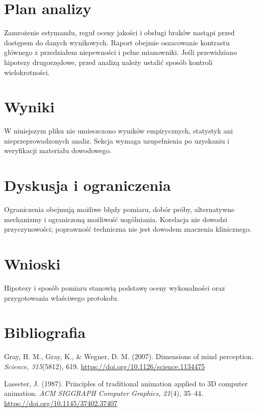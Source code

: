 \documentclass[11pt,a4paper]{article}
\begin{document}
\section{Plan analizy}

Zamrożenie estymandu, reguł oceny jakości i obsługi braków nastąpi przed dostępem do danych wynikowych. Raport obejmie oszacowanie kontrastu głównego z przedziałem niepewności i pełne mianowniki. Jeśli przewidziano hipotezy drugorzędowe, przed analizą należy ustalić sposób kontroli wielokrotności.

\section{Wyniki}

W niniejszym pliku nie umieszczono wyników empirycznych, statystyk ani nieprzeprowadzonych analiz. Sekcja wymaga uzupełnienia po uzyskaniu i weryfikacji materiału dowodowego.

\section{Dyskusja i ograniczenia}

Ograniczenia obejmują możliwe błędy pomiaru, dobór próby, alternatywne mechanizmy i ograniczoną możliwość uogólniania. Korelacja nie dowodzi przyczynowości; poprawność techniczna nie jest dowodem znaczenia klinicznego.

\section{Wnioski}

Hipotezy i sposób pomiaru stanowią podstawę oceny wykonalności oraz przygotowania właściwego protokołu.

\section*{Bibliografia}

{\setlength{\parindent}{0pt}
\setlength{\parskip}{5pt}
\hangindent=1.27cm
Gray, H. M., Gray, K., \& Wegner, D. M. (2007). Dimensions of mind perception. \textit{Science, 315}(5812), 619. \url{https://doi.org/10.1126/science.1134475}\par
\hangindent=1.27cm
Lasseter, J. (1987). Principles of traditional animation applied to 3D computer animation. \textit{ACM SIGGRAPH Computer Graphics, 21}(4), 35--44. \url{https://doi.org/10.1145/37402.37407}\par
}
\end{document}
